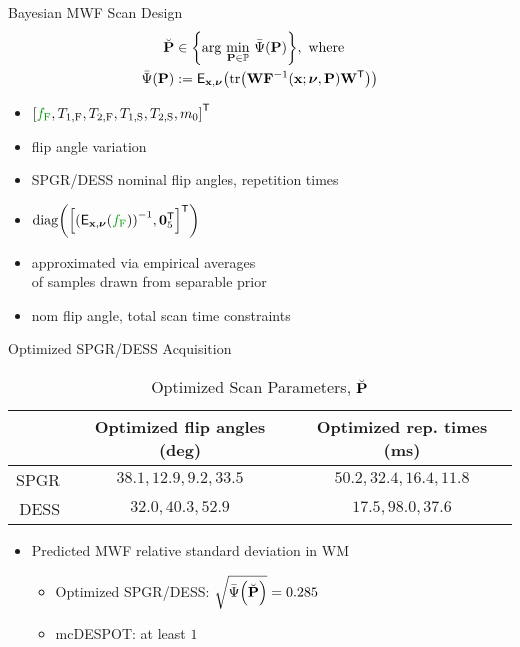 \begin{frame}{Bayesian MWF Scan Design}
	\begin{align}
    \breve{\bmP} &\in 
    	\set{
        \argmin{\bmP \in \setP}
        \expcost\paren{\bmP}
    	}, \where \nonumber \\
		\expcost\paren{\bmP} &:=
    	\expect{\bmx,\bmnu}{\trace{\bmW \bmF^{-1}\paren{\bmx; \bmnu, \bmP} \bmW\tpose}}
  \end{align}
  \vspace{-0.5cm}
  \begin{itemize}
  	\item<2>{%
			\makebox[1.5cm][l]{$\bmx$} 
			$\brac{\hlg{\ff}, \tf{1}, \tf{2}, \ts{1}, \ts{2}, \mzero}\tpose$
		}
		\item<2>{%
			\makebox[1.5cm][l]{$\bmnu$}
			flip angle variation
		}
		\item<2>{%
			\makebox[1.5cm][l]{$\bmP$}
			SPGR/DESS nominal flip angles, repetition times
		}
		\item<3>{%
			\makebox[1.5cm][l]{$\bmW$}
			$\diag{\brac{\inv{\expect{\bmx,\bmnu}{\hlg{\ff}}}, \zeros{5}\tpose}\tpose}$
		}
		\item<4>{%
			\makebox[1.5cm][l]{$\expect{\bmx,\bmnu}{\cdot}$}
			approximated via empirical averages \\
			\makebox[1.5cm][l]{}
			of samples drawn from separable prior
		}
		\item<5>{%
			\makebox[1.5cm][l]{$\setP$}
			nom flip angle, total scan time constraints
		}
  \end{itemize}
\end{frame}

\begin{frame}{Optimized SPGR/DESS Acquisition}
	\begin{table}[!tb]
    \centering
    \begin{tabular}{r | c | c}
      \hline
      \hline
      & Optimized flip angles (deg) & Optimized rep. times (ms) \\
      \hline
      SPGR & $38.1,12.9,9.2,33.5$ 	& $50.2,32.4,16.4,11.8$ \\
      DESS & $32.0,40.3,52.9$ 			& $17.5,98.0,37.6$ \\
      \hline
      \hline
    \end{tabular}
    \caption{Optimized Scan Parameters, $\breve{\mathbf{P}}$}
		\label{tab:mwf,acq}
	\end{table}
	\begin{itemize}
		\item{%
			Predicted MWF relative standard deviation in WM
			\begin{itemize} 
				\item{%
					Optimized SPGR/DESS:
					$\sqrt{\expcost\paren{\breve{\bmP}}} = 0.285$
				}
				\item{%
					mcDESPOT: at least $1$ \hfill {}
				}
			\end{itemize}
		} 
	\end{itemize}
\end{frame}

